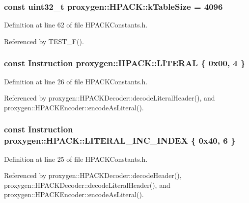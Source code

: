 \subsubsection[{k\+Table\+Size}]{\setlength{\rightskip}{0pt plus 5cm}const uint32\+\_\+t proxygen\+::\+H\+P\+A\+C\+K\+::k\+Table\+Size = 4096}\label{namespaceproxygen_1_1HPACK_a7b243d3cc0894b78b0abf7f27929cc07}


Definition at line 62 of file H\+P\+A\+C\+K\+Constants.\+h.



Referenced by T\+E\+S\+T\+\_\+\+F().

\subsubsection[{L\+I\+T\+E\+R\+AL}]{\setlength{\rightskip}{0pt plus 5cm}const {\bf Instruction} proxygen\+::\+H\+P\+A\+C\+K\+::\+L\+I\+T\+E\+R\+AL \{ 0x00, 4 \}}\label{namespaceproxygen_1_1HPACK_a8656b9063f59fb6c7d5fba310409e537}


Definition at line 26 of file H\+P\+A\+C\+K\+Constants.\+h.



Referenced by proxygen\+::\+H\+P\+A\+C\+K\+Decoder\+::decode\+Literal\+Header(), and proxygen\+::\+H\+P\+A\+C\+K\+Encoder\+::encode\+As\+Literal().

\subsubsection[{L\+I\+T\+E\+R\+A\+L\+\_\+\+I\+N\+C\+\_\+\+I\+N\+D\+EX}]{\setlength{\rightskip}{0pt plus 5cm}const {\bf Instruction} proxygen\+::\+H\+P\+A\+C\+K\+::\+L\+I\+T\+E\+R\+A\+L\+\_\+\+I\+N\+C\+\_\+\+I\+N\+D\+EX \{ 0x40, 6 \}}\label{namespaceproxygen_1_1HPACK_a591f6f70d7bb8e65c73104aa4e52bb65}


Definition at line 25 of file H\+P\+A\+C\+K\+Constants.\+h.



Referenced by proxygen\+::\+H\+P\+A\+C\+K\+Decoder\+::decode\+Header(), proxygen\+::\+H\+P\+A\+C\+K\+Decoder\+::decode\+Literal\+Header(), and proxygen\+::\+H\+P\+A\+C\+K\+Encoder\+::encode\+As\+Literal().

